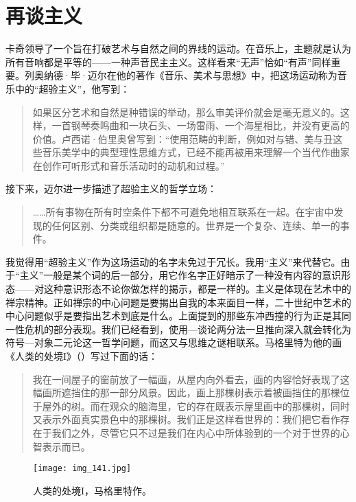 \section{再谈主义}

卡奇领导了一个旨在打破艺术与自然之间的界线的运动。在音乐上，主题就是认为所有音响都是平等的——一种声音民主主义。这样看来“无声”恰如“有声”同样重要。列奥纳德·毕·迈尔在他的著作《音乐、美术与思想》中，把这场运动称为音乐中的“超验主义”，他写到：

\begin{quote}
如果区分艺术和自然是种错误的举动，那么审美评价就会是毫无意义的。这样，一首钢琴奏鸣曲和一块石头、一场雷雨、一个海星相比，并没有更高的价值。卢西诺·伯里奥\lnote{[一位现代作曲家]}曾写到：“使用范畴的判断，例如对与错、美与丑这些音乐美学中的典型理性思维方式，已经不能再被用来理解一个当代作曲家在创作可听形式和音乐活动时的动机和过程。”
\end{quote}

接下来，迈尔进一步描述了超验主义的哲学立场：

\begin{quote}
……所有事物在所有时空条件下都不可避免地相互联系在一起。在宇宙中发现的任何区别、分类或组织都是随意的。世界是一个复杂、连续、单一的事件。
\end{quote}

我觉得用“超验主义”作为这场运动的名字未免过于冗长。我用“主义”来代替它。由于“主义”一般是某个词的后一部分，用它作名字正好暗示了一种没有内容的意识形态——对这种意识形态不论你做怎样的揭示，都是一样的。主义是体现在艺术中的禅宗精神。正如禅宗的中心问题是要揭出自我的本来面目一样，二十世纪中艺术的中心问题似乎是要指出艺术到底是什么。上面提到的那些东冲西撞的行为正是其同一性危机的部分表现。我们已经看到，使用—谈论两分法一旦推向深入就会转化为符号—对象二元论这一哲学问题，而这又与思维之谜相联系。马格里特为他的画《人类的处境I》（）写过下面的话：

\begin{quote}
我在一间屋子的窗前放了一幅画，从屋内向外看去，画的内容恰好表现了这幅画所遮挡住的那一部分风景。因此，画上那棵树表示着被画挡住的那棵位于屋外的树。而在观众的脑海里，它的存在既表示屋里画中的那棵树，同时又表示外面真实景色中的那棵树。我们正是这样看世界的：我们把它看作存在于我们之外，尽管它只不过是我们在内心中所体验到的一个对于世界的心智表示而已。
\end{quote}

\begin{figure}
\texttt{[image: img\_141.jpg]}
\caption[人类的处境I，马格里特作。]
  {人类的处境I，马格里特作。}
\end{figure}

